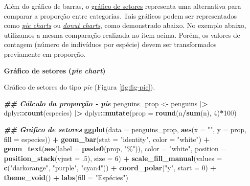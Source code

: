 \documentclass[
]{article}
\newenvironment{Shaded}{\begin{snugshade}}{\end{snugshade}}
\newcommand{\AttributeTok}[1]{\textcolor[rgb]{0.13,0.29,0.53}{#1}}
\newcommand{\DecValTok}[1]{\textcolor[rgb]{0.00,0.00,0.81}{#1}}
\newcommand{\DocumentationTok}[1]{\textcolor[rgb]{0.56,0.35,0.01}{\textbf{\textit{#1}}}}
\newcommand{\FunctionTok}[1]{\textcolor[rgb]{0.13,0.29,0.53}{\textbf{#1}}}
\newcommand{\NormalTok}[1]{#1}
\newcommand{\OtherTok}[1]{\textcolor[rgb]{0.56,0.35,0.01}{#1}}
\newcommand{\SpecialCharTok}[1]{\textcolor[rgb]{0.81,0.36,0.00}{\textbf{#1}}}
\newcommand{\StringTok}[1]{\textcolor[rgb]{0.31,0.60,0.02}{#1}}
\begin{document}
Além do gráfico de barras, o \href{https://www.data-to-viz.com/caveat/pie.html}{gráfico de setores} representa uma alternativa para comparar a proporção entre categorias. Tais gráficos podem ser representados como \href{https://datavizproject.com/data-type/pie-chart/}{\emph{pie charts}} ou \href{https://datavizproject.com/data-type/donut-chart/}{\emph{donut charts}}, como demonstrado abaixo. No exemplo abaixo, utilizamos a mesma comparação realizada no item acima. Porém, os valores de contagem (número de indivíduos por espécie) devem ser transformados previamente em proporção.

\textbf{Gráfico de setores (\emph{pie chart})}

Gráfico de setores do tipo \emph{pie} (Figura \ref{fig:fig-pie}).

\begin{Shaded}
\begin{Highlighting}[]
\DocumentationTok{\#\# Cálculo da proporção {-} pie}
\NormalTok{penguins\_prop }\OtherTok{\textless{}{-}}\NormalTok{ penguins }\SpecialCharTok{|\textgreater{}}
\NormalTok{    dplyr}\SpecialCharTok{::}\FunctionTok{count}\NormalTok{(especies) }\SpecialCharTok{|\textgreater{}} 
\NormalTok{    dplyr}\SpecialCharTok{::}\FunctionTok{mutate}\NormalTok{(}\AttributeTok{prop =} \FunctionTok{round}\NormalTok{(n}\SpecialCharTok{/}\FunctionTok{sum}\NormalTok{(n), }\DecValTok{4}\NormalTok{)}\SpecialCharTok{*}\DecValTok{100}\NormalTok{)}

\DocumentationTok{\#\# Gráfico de setores}
\FunctionTok{ggplot}\NormalTok{(}\AttributeTok{data =}\NormalTok{ penguins\_prop, }\FunctionTok{aes}\NormalTok{(}\AttributeTok{x =} \StringTok{""}\NormalTok{, }\AttributeTok{y =}\NormalTok{ prop, }\AttributeTok{fill =}\NormalTok{ especies)) }\SpecialCharTok{+} 
    \FunctionTok{geom\_bar}\NormalTok{(}\AttributeTok{stat =} \StringTok{"identity"}\NormalTok{, }\AttributeTok{color =} \StringTok{"white"}\NormalTok{) }\SpecialCharTok{+}
    \FunctionTok{geom\_text}\NormalTok{(}\FunctionTok{aes}\NormalTok{(}\AttributeTok{label =} \FunctionTok{paste0}\NormalTok{(prop, }\StringTok{"\%"}\NormalTok{)), }\AttributeTok{color =} \StringTok{"white"}\NormalTok{, }
              \AttributeTok{position =} \FunctionTok{position\_stack}\NormalTok{(}\AttributeTok{vjust =}\NormalTok{ .}\DecValTok{5}\NormalTok{), }\AttributeTok{size =} \DecValTok{6}\NormalTok{) }\SpecialCharTok{+}
    \FunctionTok{scale\_fill\_manual}\NormalTok{(}\AttributeTok{values =} \FunctionTok{c}\NormalTok{(}\StringTok{"darkorange"}\NormalTok{, }\StringTok{"purple"}\NormalTok{, }\StringTok{"cyan4"}\NormalTok{)) }\SpecialCharTok{+}
    \FunctionTok{coord\_polar}\NormalTok{(}\StringTok{"y"}\NormalTok{, }\AttributeTok{start =} \DecValTok{0}\NormalTok{) }\SpecialCharTok{+}
    \FunctionTok{theme\_void}\NormalTok{() }\SpecialCharTok{+}
    \FunctionTok{labs}\NormalTok{(}\AttributeTok{fill =} \StringTok{"Espécies"}\NormalTok{)}
\end{Highlighting}
\end{Shaded}
\end{document}
